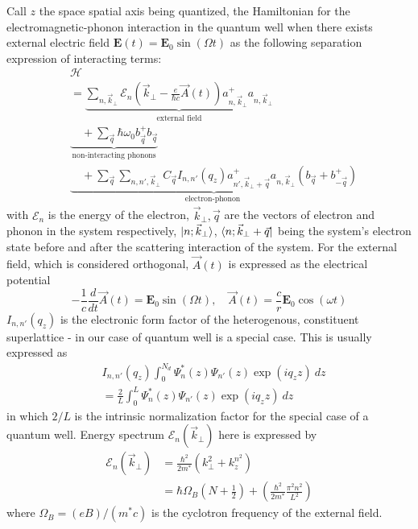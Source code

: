 \documentclass[%
 reprint,
 amsmath,amssymb,
 aps,
]{revtex4-2}
\begin{document}
Call $z$ the space spatial axis being quantized, the Hamiltonian for the electromagnetic-phonon interaction in the quantum well when there exists external electric field $\mathbf{E}(t)=\mathbf{E}_{0}\sin{(\Omega t)}$ as the following separation expression of interacting terms:
\begin{align}
    &\mathcal{H}\\
    & = \underbrace{\sum_{n,\vec{k}_{\perp}} \mathcal{E}_{n}\left(\vec{k}_{\perp} - \frac{e}{\hbar c} \vec{A}(t)\right)a^{+}_{n,\vec{k}_{\perp}} a_{n,\vec{k}_{\perp}} }_{\text{external field}} \\ 
    & \underbrace{\quad + \sum_{\vec{q}} \hbar \omega_{0} b_{\vec{q}}^{+} b_{\vec{q}}}_{\text{non-interacting phonons} } \\
    & \underbrace{\quad + \sum_{\vec{q}} \sum_{n,n', \vec{k}_{\perp}} C_{\vec{q}} I_{n,n'}(q_{z}) a^{+}_{n',\vec{k}_{\perp}+\vec{q}} a_{n,\vec{k}_{\perp}} \left(b_{\vec{q}} + b^{+}_{- \vec{q}}\right)}_{\text{electron-phonon }}
\end{align}
with $\mathcal{E}_{n}$ is the energy of the electron, $\vec{k}_{\perp}, \vec{q}$ are the vectors of electron and phonon in the system respectively, $\ket{n; \vec{k}_{\perp}}$, $\bra{n;\vec{k}_{\perp}+\vec{q}}$ being the system's electron state before and after the scattering interaction of the system. For the external field, which is considered orthogonal, $\vec{A}(t)$ is expressed as the electrical potential 
\begin{equation}
    -\frac{1}{c} \frac{d}{dt} \vec{A}(t) = \mathbf{E}_{0}\sin{(\Omega t)},\quad  \vec{A}(t) = \frac{c}{r} \mathbf{E}_{0}\cos{(\omega t )}
\end{equation}
$I_{n,n'}(q_{z})$ is the electronic form factor of the heterogenous, constituent superlattice - in our case of quantum well is a special case. This is usually expressed as 
\begin{equation}
    \begin{split}
        &I_{n,n'}(q_{z}) \int_{0}^{N_{d}} \Psi^{*}_{n}(z) \Psi_{n'}(z)\exp{(iq_{z}z)}\: dz \\
        &= \frac{2}{L} \int_{0}^{L} \Psi^{*}_{n}(z)\Psi_{n'}(z)\exp{(iq_{z}z)}\: dz
    \end{split}
\end{equation}
in which $2/L$ is the intrinsic normalization factor for the special case of a quantum well. Energy spectrum $\mathcal{E}_{n}(\vec{k}_{\perp})$ here is expressed by 
\begin{equation}
    \begin{split}
        \mathcal{E}_{n}(\vec{k}_{\perp}) &= \frac{\hbar^{2}}{2m^{*}} \left( k_{\perp}^{2} + k_{z}^{n^{2}} \right) \\
        &= \hbar \Omega_{B} \left(N + \frac{1}{2}\right) + \left(\frac{\hbar^{2}}{2m^{*}} \frac{\pi^{2}n^{2}}{L^{2}}\right)
    \end{split}
\end{equation}
where $\Omega_{B}=(eB)/(m^{*}c)$ is the cyclotron frequency of the external field. 
\end{document}

